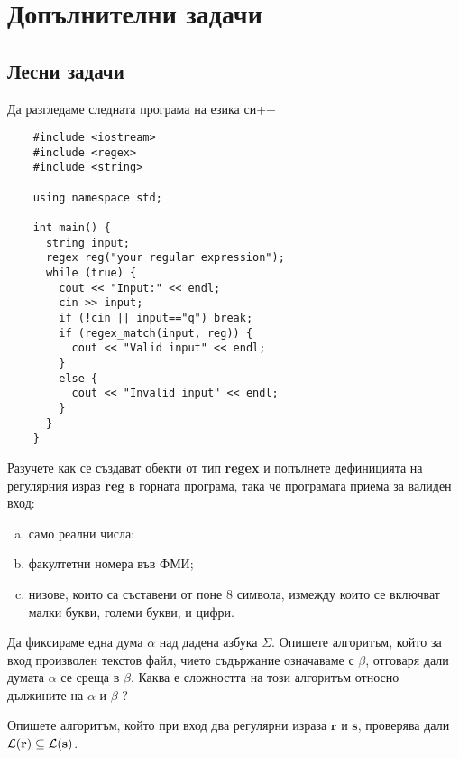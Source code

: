 \section{Допълнителни задачи}

\subsection{Лесни задачи}

\ifcode
\begin{problem}
  Да разгледаме следната програма на езика си++
  \begin{verbatim}
    #include <iostream>
    #include <regex>
    #include <string>
    
    using namespace std;
    
    int main() {
      string input;
      regex reg("your regular expression");
      while (true) {
        cout << "Input:" << endl;
        cin >> input;
        if (!cin || input=="q") break;
        if (regex_match(input, reg)) {
          cout << "Valid input" << endl;
        }  
        else {
          cout << "Invalid input" << endl;
        }
      }
    }
  \end{verbatim}
  Разучете как се създават обекти от тип {\bf regex} и попълнете дефиницията на регулярния израз {\bf reg} в горната програма, така че програмата приема за валиден вход:
  \begin{enumerate}[a)]
  \item 
    само реални числа;
  \item
    факултетни номера във ФМИ;
  \item
    низове, които са съставени от поне 8 символа, измежду които се включват малки букви, големи букви,
    и цифри.    
  \end{enumerate}
\end{problem}
\fi

\begin{problem}
  Да фиксираме една дума $\alpha$ над дадена азбука $\Sigma$.
  Опишете алгоритъм, който за вход произволен текстов файл, чието съдържание означаваме с $\beta$,
  отговаря дали думата $\alpha$ се среща в $\beta$.
  Каква е сложността на този алгоритъм относно дължините на $\alpha$ и $\beta$ ?
\end{problem}

\begin{problem}
  Опишете алгоритъм, който при вход два регулярни израза $\mathbf{r}$ и $\mathbf{s}$,
  проверява дали $\mathcal{L}(\mathbf{r}) \subseteq \mathcal{L}(\mathbf{s})$.
\end{problem}


